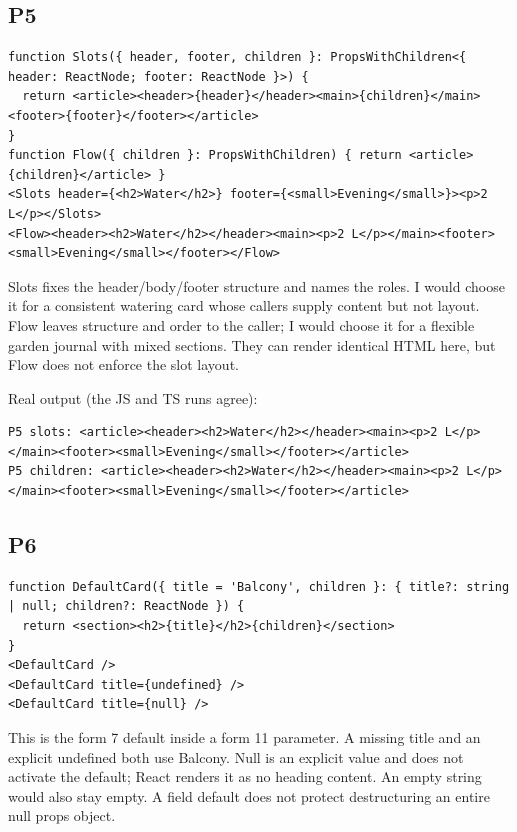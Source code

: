 \documentclass[
  10pt,
  a4paper,
]{article}
\begin{document}
\subsection{P5}\label{p5}

\begin{lstlisting}
function Slots({ header, footer, children }: PropsWithChildren<{ header: ReactNode; footer: ReactNode }>) {
  return <article><header>{header}</header><main>{children}</main><footer>{footer}</footer></article>
}
function Flow({ children }: PropsWithChildren) { return <article>{children}</article> }
<Slots header={<h2>Water</h2>} footer={<small>Evening</small>}><p>2 L</p></Slots>
<Flow><header><h2>Water</h2></header><main><p>2 L</p></main><footer><small>Evening</small></footer></Flow>
\end{lstlisting}

Slots fixes the header/body/footer structure and names the roles. I
would choose it for a consistent watering card whose callers supply
content but not layout. Flow leaves structure and order to the caller; I
would choose it for a flexible garden journal with mixed sections. They
can render identical HTML here, but Flow does not enforce the slot
layout.

Real output (the JS and TS runs agree):

\begin{lstlisting}
P5 slots: <article><header><h2>Water</h2></header><main><p>2 L</p></main><footer><small>Evening</small></footer></article>
P5 children: <article><header><h2>Water</h2></header><main><p>2 L</p></main><footer><small>Evening</small></footer></article>
\end{lstlisting}

\subsection{P6}\label{p6}

\begin{lstlisting}
function DefaultCard({ title = 'Balcony', children }: { title?: string | null; children?: ReactNode }) {
  return <section><h2>{title}</h2>{children}</section>
}
<DefaultCard />
<DefaultCard title={undefined} />
<DefaultCard title={null} />
\end{lstlisting}

This is the form 7 default inside a form 11 parameter. A missing title
and an explicit undefined both use Balcony. Null is an explicit value
and does not activate the default; React renders it as no heading
content. An empty string would also stay empty. A field default does not
protect destructuring an entire null props object.
\end{document}

